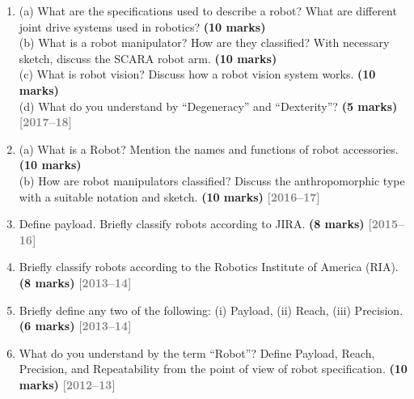 \documentclass[12pt,a3paper]{article}
\newcommand{\yr}[1]{\hfill\textcolor{gray}{\small\textbf{[#1]}}}
\newcommand{\mk}[1]{\textcolor{orange!70!black}{\small\textbf{(#1 marks)}}}
\begin{document}
\begin{enumerate}
\item \label{qlabel:C1-Q5}
(a) What are the specifications used to describe a robot? What are different joint drive systems used in robotics? \mk{10}\\
(b) What is a robot manipulator? How are they classified? With necessary sketch, discuss the SCARA robot arm. \mk{10}\\
(c) What is robot vision? Discuss how a robot vision system works. \mk{10}\\
(d) What do you understand by ``Degeneracy'' and ``Dexterity''? \mk{5}
\yr{2017--18}




\item \label{qlabel:C1-Q4}
(a) What is a Robot? Mention the names and functions of robot accessories. \mk{10}\\
(b) How are robot manipulators classified? Discuss the anthropomorphic type with a suitable notation and sketch. \mk{10}
\yr{2016--17}




\item \label{qlabel:C1-Q16}
Define payload. Briefly classify robots according to JIRA. \mk{8}
\yr{2015--16}





\item \label{qlabel:C1-Q7}
Briefly classify robots according to the Robotics Institute of America (RIA). \mk{8}
\yr{2013--14}




\item \label{qlabel:C1-Q8}
Briefly define any two of the following: (i) Payload, (ii) Reach, (iii) Precision. \mk{6}
\yr{2013--14}




\item \label{qlabel:C1-Q9}
What do you understand by the term ``Robot''? Define Payload, Reach, Precision, and Repeatability from the point of view of robot specification. \mk{10}
\yr{2012--13}





\end{enumerate}
\end{document}
